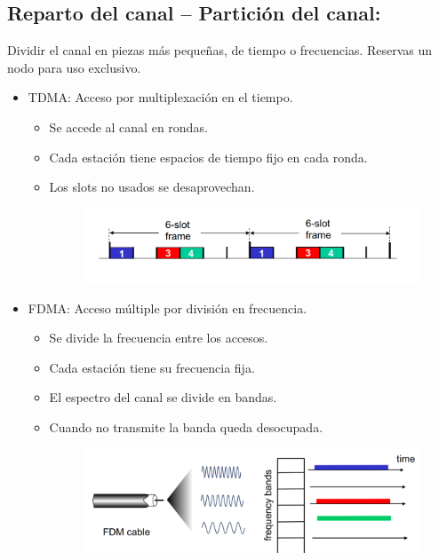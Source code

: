 \documentclass[12pt, twoside, openright]{report} %
\begin{document}
\subsection{Reparto del canal -- Partición del canal:}
Dividir el canal en
piezas más pequeñas, de tiempo o frecuencias. Reservas un nodo
para uso exclusivo.
\pagebreak
\begin{itemize}
	\item TDMA: Acceso por multiplexación en el tiempo.

	      \begin{itemize}
		      \item Se accede al canal en rondas.
		      \item Cada estación tiene espacios de tiempo fijo en cada ronda.
		      \item Los slots no usados se desaprovechan.
		            \begin{figure}[H]
			            {\includegraphics[scale=.25]{Untitled 48.png}}
		            \end{figure}
	      \end{itemize}
	\item FDMA: Acceso múltiple por división en frecuencia.

	      \begin{itemize}
		      \item Se divide la frecuencia entre los accesos.
		      \item Cada estación tiene su frecuencia fija.
		      \item El espectro del canal se divide en bandas.
		      \item Cuando no transmite la banda queda desocupada.
		            \begin{figure}[H]
			            {\includegraphics[scale=.2]{Untitled 49.png}}
		            \end{figure}
	      \end{itemize}
\end{itemize}
\end{document}
